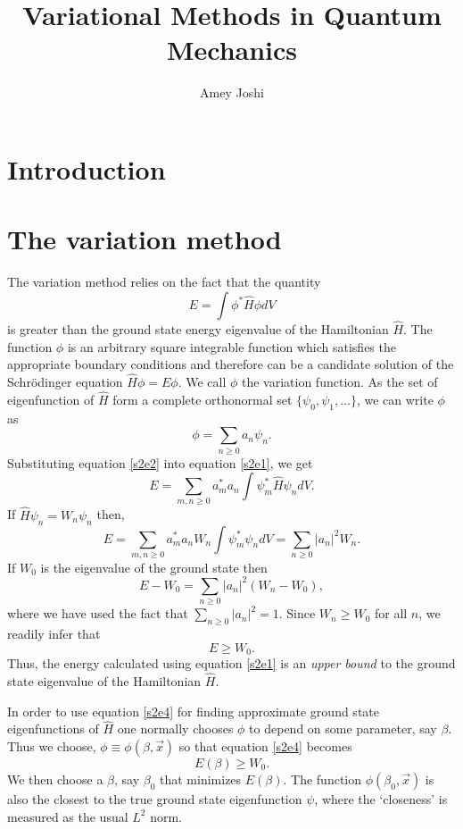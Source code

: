 \documentclass{article}
\numberwithin{equation}{section}
\begin{document}
\title{Variational Methods in Quantum Mechanics}
\author{Amey Joshi}
\maketitle
\section{Introduction}\label{s1}
\section{The variation method}\label{s2}
The variation method relies on the fact that the quantity
\begin{equation}\label{s2e1}
E = \int\phi^\ast\hat{H}\phi dV
\end{equation}
is greater than the ground state energy eigenvalue of the Hamiltonian 
$\hat{H}$. The function $\phi$ is an arbitrary square integrable function
which satisfies the appropriate boundary conditions and therefore can be 
a candidate solution of the Schr\"{o}dinger equation $\hat{H}\phi = E\phi$.
We call $\phi$ the variation function. As the set of eigenfunction of 
$\hat{H}$ form a complete orthonormal set $\{\psi_0, \psi_1, \ldots\}$, 
we can write $\phi$ as
\begin{equation}\label{s2e2}
\phi = \sum_{n \ge 0}a_n\psi_n.
\end{equation}
Substituting equation \eqref{s2e2} into equation \eqref{s2e1}, we get
\[
E = \sum_{m,n \ge 0}a_m^\ast a_n \int \psi_m^\ast \hat{H}\psi_n dV.
\]
If $\hat{H}\psi_n = W_n\psi_n$ then,
\[
E = \sum_{m,n \ge 0}a_m^\ast a_n W_n \int\psi_m^\ast\psi_n dV = 
\sum_{n \ge 0}|a_n|^2W_n.
\]
If $W_0$ is the eigenvalue of the ground state then
\begin{equation}\label{s2e3}
E - W_0 = \sum_{n \ge 0}|a_n|^2(W_n - W_0),
\end{equation}
where we have used the fact that $\sum_{n \ge 0}|a_n|^2 = 1$. Since 
$W_n \ge W_0$ for all $n$, we readily infer that
\begin{equation}\label{s2e4}
E \ge W_0.
\end{equation}
Thus, the energy calculated using equation \eqref{s2e1} is an 
\emph{upper bound} to the ground state eigenvalue of the Hamiltonian 
$\hat{H}$. 

In order to use equation \eqref{s2e4} for finding approximate ground state
eigenfunctions of $\hat{H}$ one normally chooses $\phi$ to depend on some 
parameter, say $\beta$. Thus we choose, $\phi \equiv \phi(\beta, \vec{x})$
so that equation \eqref{s2e4} becomes
\begin{equation}\label{s2e5}
E(\beta) \ge W_0.
\end{equation}
We then choose a $\beta$, say $\beta_0$ that minimizes $E(\beta)$. The 
function $\phi(\beta_0, \vec{x})$ is also the closest to the true ground 
state eigenfunction $\psi$, where the `closeness' is measured as the usual 
$L^2$ norm.
\end{document}
